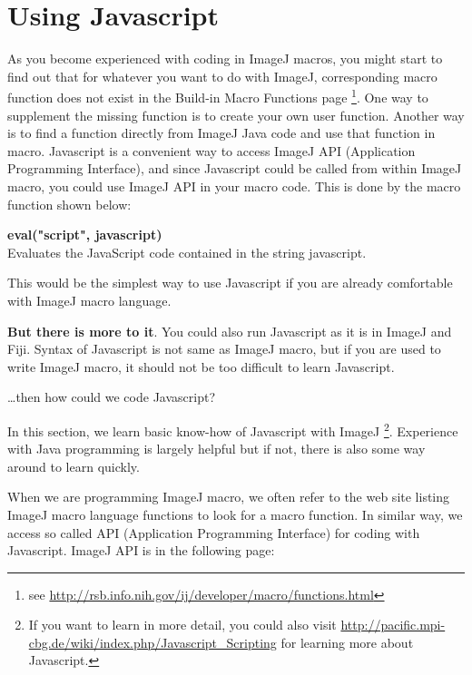 \documentclass[11pt,a4paper,oneside]{report}
\newenvironment{indentCom}%
{\begin{list}{}%
         {\setlength{\leftmargin}{1em}}%
         \item[]%
}
{\end{list}}
\begin{document}
\newpage

\section{Using Javascript}

As you become experienced with coding in ImageJ macros, you might start to find
out that for whatever you want to do with ImageJ, 
corresponding macro function does not exist in the Build-in Macro Functions page
\footnote{ see \url{http://rsb.info.nih.gov/ij/developer/macro/functions.html}}. 
One way to supplement the missing function is to create your own user function. 
Another way is to find a function directly from ImageJ Java code and use that function in macro. 
Javascript is a convenient way to access ImageJ API (Application Programming Interface), 
and since Javascript could be called from within ImageJ macro, you could use ImageJ API in your macro code. 
This is done by the macro function shown below:
\begin{shaded}
\begin{indentCom}
\item \textbf{eval("script", javascript)}\\
Evaluates the JavaScript code contained in the string javascript.\\
\end{indentCom}
\end{shaded}

This would be the simplest way to use Javascript if you are already
comfortable with ImageJ macro language. 

\textbf{But there is more to it}. You could also run Javascript as it is in
ImageJ and Fiji. Syntax of Javascript is not same as ImageJ macro, 
but if you are used to write ImageJ macro, it should not be too difficult to learn Javascript.  
 
\dots then how could we code Javascript? 

In this section, we learn basic know-how of 
Javascript with ImageJ 
\footnote{ If you want to learn in more detail, 
you could also visit \url{http://pacific.mpi-cbg.de/wiki/index.php/Javascript_Scripting} 
for learning more about Javascript.}. Experience with 
Java programming is largely helpful but if not, there is also some way around
to learn quickly. 

When we are programming ImageJ macro, we often refer to the
web site listing ImageJ macro language functions to look for a macro function. 
In similar way, we access so called API (Application Programming Interface) 
for coding with Javascript. ImageJ API is in the following page:
\end{document}
